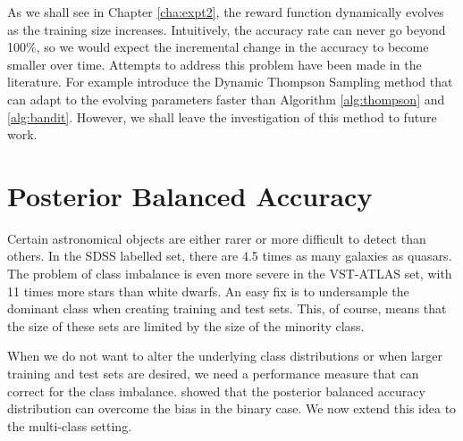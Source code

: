 As we shall see in Chapter \ref{cha:expt2}, the reward function dynamically evolves as the training
size increases. Intuitively, the accuracy rate can never go beyond 100\%, so we would expect the
incremental change in the accuracy to become smaller over time. Attempts to address this problem
have been made in the literature. For example  introduce the Dynamic Thompson
Sampling method that can adapt to the evolving parameters faster than Algorithm \ref{alg:thompson}
and \ref{alg:bandit}. However, we shall leave the investigation of this method to future work.


\section{Posterior Balanced Accuracy}
\label{sec:measures}

Certain astronomical objects are either rarer or more difficult to detect than others. In the SDSS
labelled set, there are 4.5 times as many galaxies as quasars. The problem of class imbalance is
even more severe in the VST-ATLAS set, with 11 times more stars than white dwarfs. An easy fix is
to undersample the dominant class when creating training and test sets. This, of course, means that
the size of these sets are limited by the size of the minority class.

When we do not want to alter the underlying class distributions or when larger training and test
sets are desired, we need a performance measure that can correct for the class imbalance.
 showed that the posterior balanced accuracy distribution can overcome the
bias in the binary case. We now extend this idea to the multi-class setting.

